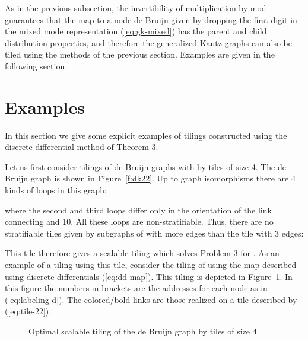 \documentclass[12pt]{article}
\begin{document}
As in the previous subsection, the invertibility of multiplication by
 mod  guarantees that the map to a  node de Bruijn given by
dropping the first digit  in the mixed mode representation
(\ref{eq:gk-mixed}) has the parent and child distribution properties,
and therefore the generalized Kautz graphs can also be tiled using the
methods of the previous section.  Examples are given in the following
section.

\section{Examples}
\label{sec:examples}

In this section we give some explicit examples of tilings constructed
using the discrete differential method of Theorem 3.


Let us first consider tilings of
de Bruijn graphs with  by tiles of size 4.  The de Bruijn graph
 is shown in  Figure~\ref{f:dk22}.  Up to graph
isomorphisms there are  4 kinds of loops in this graph: 

where the second and third
loops differ only in the orientation of the link connecting
 and 10.
All these loops are non-stratifiable.  Thus, there are no stratifiable
tiles given by subgraphs of  with more  edges than the
tile with 3 edges:

This tile therefore gives a scalable tiling which solves Problem 3 for
.  As an example of a tiling using this tile,
consider the tiling of  using the map  described
using discrete differentials (\ref{eq:dd-map}).  This tiling is
depicted in Figure~\ref{f:d23}.  In this figure the numbers in
brackets are the addresses  for each node as in
(\ref{eq:labeling-d}).  The colored/bold links are those realized on
a tile  described by (\ref{eq:tile-22}).
\begin{figure}
\begin{center}
\end{center}
\caption[x]{\footnotesize Optimal scalable
tiling of the de Bruijn graph
 by tiles of size 4}
\label{f:d23}
\end{figure}
\end{document}
